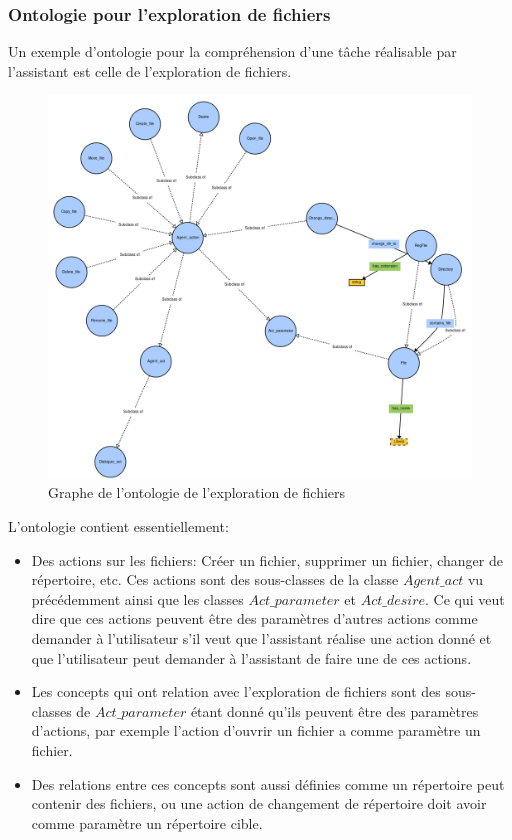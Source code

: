 \subsubsection*{Ontologie pour l'exploration de fichiers}
Un exemple d'ontologie pour la compréhension d'une tâche réalisable par l'assistant est celle de l'exploration de fichiers.
\begin{figure}[H] 
	
	\centering
	\includegraphics[width=0.95\linewidth]{images/Conception/DM/onto_browser.png}
	\caption{Graphe de l'ontologie de l'exploration de fichiers}
\end{figure}\label{onto_browser}
L'ontologie contient essentiellement:
\begin{itemize}
	\item Des actions sur les fichiers: Créer un fichier, supprimer un fichier, changer de répertoire, etc. Ces actions sont des sous-classes de la classe  $Agent\_act$ vu précédemment ainsi que les classes $Act\_parameter$ et $Act\_desire$. Ce qui veut dire que ces actions peuvent être des paramètres d'autres actions comme demander à l'utilisateur s'il veut que l'assistant réalise une action donné et que l'utilisateur peut demander à l'assistant de faire une de ces actions. 
	\item Les concepts qui ont relation avec l'exploration de fichiers sont des sous-classes de $Act\_parameter$ étant donné qu'ils peuvent  être des paramètres d'actions, par exemple l'action d'ouvrir un fichier a comme paramètre un fichier.
	\item Des relations entre ces concepts sont aussi définies comme un répertoire peut contenir des fichiers, ou une action de changement de répertoire doit avoir comme paramètre un répertoire cible.
\end{itemize}
